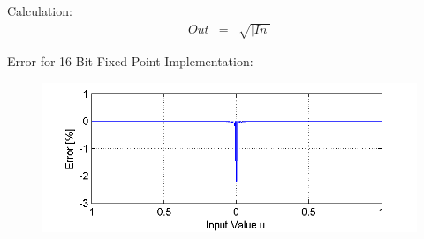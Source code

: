 Calculation:
\begin{eqnarray*}
	Out &=& \sqrt{|In|}
\end{eqnarray*}

Error for 16 Bit Fixed Point Implementation:
\begin{figure}[H]
	\includegraphics[width=\textwidth]{Sqrt_Error}
\end{figure}

